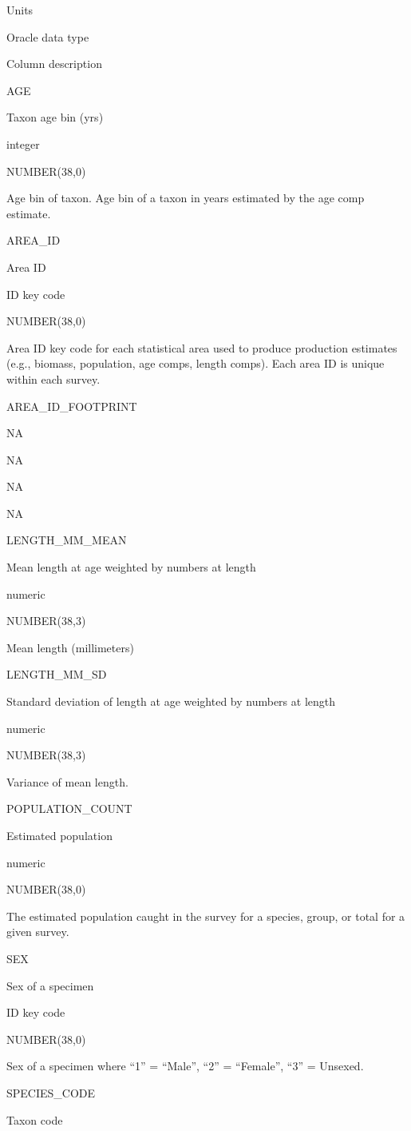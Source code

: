 \documentclass[
  letterpaper,
  oneside,
  open=any]{scrbook}
\begin{document}
Units

Oracle data type

Column description

AGE

Taxon age bin (yrs)

integer

NUMBER(38,0)

Age bin of taxon. Age bin of a taxon in years estimated by the age comp
estimate.

AREA\_ID

Area ID

ID key code

NUMBER(38,0)

Area ID key code for each statistical area used to produce production
estimates (e.g., biomass, population, age comps, length comps). Each
area ID is unique within each survey.

AREA\_ID\_FOOTPRINT

NA

NA

NA

NA

LENGTH\_MM\_MEAN

Mean length at age weighted by numbers at length

numeric

NUMBER(38,3)

Mean length (millimeters)

LENGTH\_MM\_SD

Standard deviation of length at age weighted by numbers at length

numeric

NUMBER(38,3)

Variance of mean length.

POPULATION\_COUNT

Estimated population

numeric

NUMBER(38,0)

The estimated population caught in the survey for a species, group, or
total for a given survey.

SEX

Sex of a specimen

ID key code

NUMBER(38,0)

Sex of a specimen where ``1'' = ``Male'', ``2'' = ``Female'', ``3'' =
Unsexed.

SPECIES\_CODE

Taxon code
\end{document}
